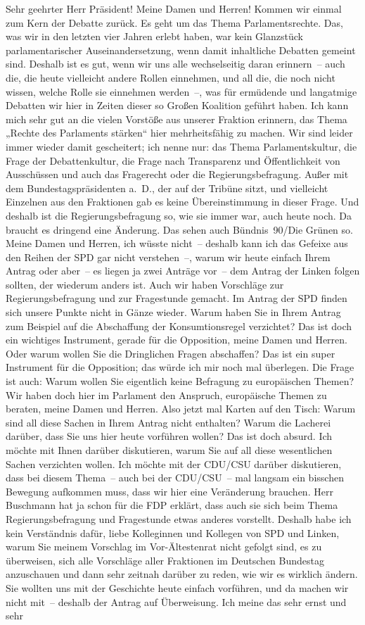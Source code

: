 \documentclass[10pt, a4paper]{report}
\begin{document}
Sehr geehrter Herr Präsident! Meine Damen und Herren! Kommen wir einmal zum Kern der Debatte zurück. Es geht um das Thema Parlamentsrechte. Das, was wir in den letzten vier Jahren erlebt haben, war kein Glanzstück parlamentarischer Auseinandersetzung, wenn damit inhaltliche Debatten gemeint sind. Deshalb ist es gut, wenn wir uns alle wechselseitig daran erinnern – auch die, die heute vielleicht andere Rollen einnehmen, und all die, die noch nicht wissen, welche Rolle sie einnehmen werden –, was für ermüdende und langatmige Debatten wir hier in Zeiten dieser so Großen Koalition geführt haben. Ich kann mich sehr gut an die vielen Vorstöße aus unserer Fraktion erinnern, das Thema „Rechte des Parlaments stärken“ hier mehrheitsfähig zu machen. Wir sind leider immer wieder damit gescheitert; ich nenne nur: das Thema Parlamentskultur, die Frage der Debattenkultur, die Frage nach Transparenz und Öffentlichkeit von Ausschüssen und auch das Fragerecht oder die Regierungsbefragung. Außer mit dem Bundestagspräsidenten a. D., der auf der Tribüne sitzt, und vielleicht Einzelnen aus den Fraktionen gab es keine Übereinstimmung in dieser Frage. Und deshalb ist die Regierungsbefragung so, wie sie immer war, auch heute noch. Da braucht es dringend eine Änderung. Das sehen auch Bündnis 90/Die Grünen so. Meine Damen und Herren, ich wüsste nicht – deshalb kann ich das Gefeixe aus den Reihen der SPD gar nicht verstehen –, warum wir heute einfach Ihrem Antrag oder aber – es liegen ja zwei Anträge vor – dem Antrag der Linken folgen sollten, der wiederum anders ist. Auch wir haben Vorschläge zur Regierungsbefragung und zur Fragestunde gemacht. Im Antrag der SPD finden sich unsere Punkte nicht in Gänze wieder. Warum haben Sie in Ihrem Antrag zum Beispiel auf die Abschaffung der Konsumtionsregel verzichtet? Das ist doch ein wichtiges Instrument, gerade für die Opposition, meine Damen und Herren. Oder warum wollen Sie die Dringlichen Fragen abschaffen? Das ist ein super Instrument für die Opposition; das würde ich mir noch mal überlegen. Die Frage ist auch: Warum wollen Sie eigentlich keine Befragung zu europäischen Themen? Wir haben doch hier im Parlament den Anspruch, europäische Themen zu beraten, meine Damen und Herren. Also jetzt mal Karten auf den Tisch: Warum sind all diese Sachen in Ihrem Antrag nicht enthalten? Warum die Lacherei darüber, dass Sie uns hier heute vorführen wollen? Das ist doch absurd. Ich möchte mit Ihnen darüber diskutieren, warum Sie auf all diese wesentlichen Sachen verzichten wollen. Ich möchte mit der CDU/CSU darüber diskutieren, dass bei diesem Thema – auch bei der CDU/CSU – mal langsam ein bisschen Bewegung aufkommen muss, dass wir hier eine Veränderung brauchen. Herr Buschmann hat ja schon für die FDP erklärt, dass auch sie sich beim Thema Regierungsbefragung und Fragestunde etwas anderes vorstellt. Deshalb habe ich kein Verständnis dafür, liebe Kolleginnen und Kollegen von SPD und Linken, warum Sie meinem Vorschlag im Vor-Ältestenrat nicht gefolgt sind, es zu überweisen, sich alle Vorschläge aller Fraktionen im Deutschen Bundestag anzuschauen und dann sehr zeitnah darüber zu reden, wie wir es wirklich ändern. Sie wollten uns mit der Geschichte heute einfach vorführen, und da machen wir nicht mit – deshalb der Antrag auf Überweisung. Ich meine das sehr ernst und sehr 
\end{document}
